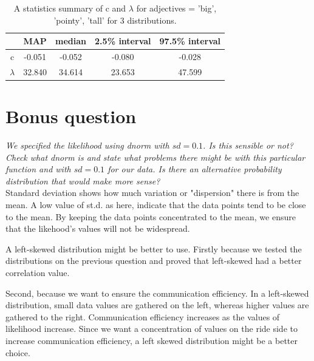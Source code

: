 \documentclass[11pt,a4paper,oneside]{article}
\begin{document}
\begin{table}[ht]
\centering
\begin{tabular}{ccccc}
  \hline
  & MAP & median & 2.5\% interval & 97.5\% interval\\ 
  \hline
    c & -0.051 & -0.052 & -0.080 & -0.028\\ 
    $\lambda$ & 32.840 & 34.614 & 23.653 & 47.599\\ 
   \hline
\end{tabular}
\caption{A statistics summary of c and $\lambda$ for adjectives = 'big', 'pointy', 'tall' for 3 distributions.}
\label{question_5}
\end{table}

\section{Bonus question}
\label{bonus}
\textit{We specified the likelihood using dnorm with $sd=0.1$. Is this sensible or not? Check what dnorm is and state what problems there might be with this particular function and with $sd=0.1$ for our data. Is there an alternative probability distribution that would make more sense?}\\

Standard deviation shows how much variation or "dispersion" there is from the mean. A low value of st.d. as here, indicate that the data points tend to be close to the mean. By keeping the data points concentrated to the mean, we ensure that the likehood's values will not be widespread. 


A left-skewed distribution might be better to use. Firstly because we tested the distributions on the previous question and proved that left-skewed had a better correlation value.

Second, because we want to ensure the communication efficiency. In a left-skewed distribution, small data values are gathered on the left, whereas higher values are gathered to the right. Communication efficiency increases as the values of likelihood increase. Since we want a concentration of values on the ride side to increase communication efficiency, a left skewed distribution might be a better choice.

\clearpage 
\printbibliography
\end{document}
